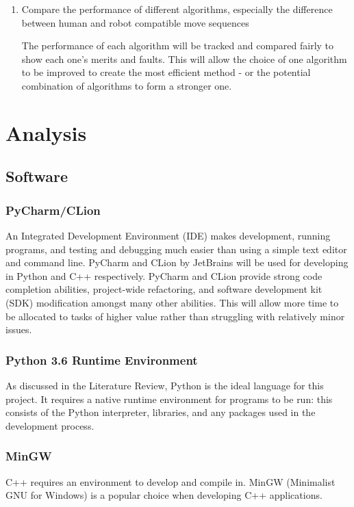 \documentclass{report}
\begin{document}
\begin{enumerate}
    	\item Compare the performance of different algorithms, especially the difference between human and robot compatible move sequences \par The performance of each algorithm will be tracked and compared fairly to show each one's merits and faults. This will allow the choice of one algorithm to be improved to create the most efficient method - or the potential combination of algorithms to form a stronger one.
    \end{enumerate}
    
    
    
    
    
    \section{Analysis}
    \subsection{Software}
    
    \subsubsection{PyCharm/CLion}
    An Integrated Development Environment (IDE) makes development, running programs, and testing and debugging much easier than using a simple text editor and command line. PyCharm and CLion by JetBrains \cite{JetBrains} will be used for developing in Python and C++ respectively. PyCharm and CLion provide strong code completion abilities, project-wide refactoring, and software development kit (SDK) modification amongst many other abilities. This will allow more time to be allocated to tasks of higher value rather than struggling with relatively minor issues.  
    
	\subsubsection{Python 3.6 Runtime Environment}
    As discussed in the Literature Review, Python is the ideal language for this project. It requires a native runtime environment for programs to be run: this consists of the Python interpreter, libraries, and any packages used in the development process.
    
    \subsubsection{MinGW}
    C++ requires an environment to develop and compile in. MinGW (Minimalist GNU for Windows) is a popular choice when developing C++ applications. %
    
\end{document}
